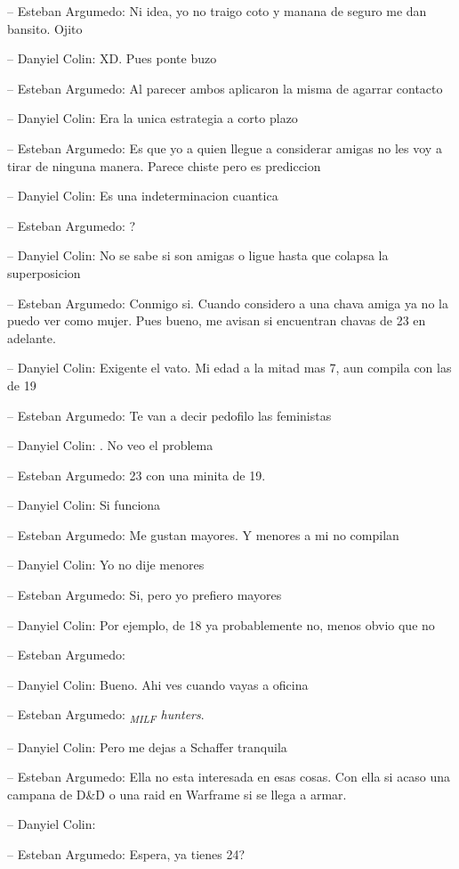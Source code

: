 -- Esteban Argumedo: Ni idea, yo no traigo coto y manana de seguro me
dan bansito. Ojito

-- Danyiel Colin: XD. Pues ponte buzo

-- Esteban Argumedo: Al parecer ambos aplicaron la misma de agarrar
contacto

-- Danyiel Colin: Era la unica estrategia a corto plazo

-- Esteban Argumedo: Es que yo a quien llegue a considerar amigas no les
voy a tirar de ninguna manera. Parece chiste pero es prediccion

-- Danyiel Colin: Es una indeterminacion cuantica

-- Esteban Argumedo: ?

-- Danyiel Colin: No se sabe si son amigas o ligue hasta que colapsa la
superposicion

-- Esteban Argumedo: Conmigo si. Cuando considero a una chava amiga ya
no la puedo ver como mujer. Pues bueno, me avisan si encuentran chavas
de 23 en adelante.

-- Danyiel Colin: Exigente el vato. Mi edad a la mitad mas 7, aun
compila con las de 19

-- Esteban Argumedo: Te van a decir pedofilo las feministas

-- Danyiel Colin: . No veo el problema

-- Esteban Argumedo: 23 con una minita de 19.

-- Danyiel Colin: Si funciona

-- Esteban Argumedo: Me gustan mayores. Y menores a mi no compilan

-- Danyiel Colin: Yo no dije menores

-- Esteban Argumedo: Si, pero yo prefiero mayores

-- Danyiel Colin: Por ejemplo, de 18 ya probablemente no, menos obvio
que no

-- Esteban Argumedo:

-- Danyiel Colin: Bueno. Ahi ves cuando vayas a oficina

-- Esteban Argumedo: \emph{\textsubscript{MILF} hunters}.

-- Danyiel Colin: Pero me dejas a Schaffer tranquila

-- Esteban Argumedo: Ella no esta interesada en esas cosas. Con ella si
acaso una campana de D\&D o una raid en Warframe si se llega a armar.

-- Danyiel Colin:

-- Esteban Argumedo: Espera, ya tienes 24?

